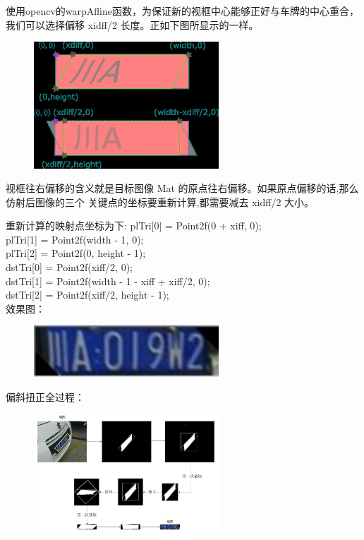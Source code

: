 \begin{enumerate}
使用opencv的warpAffine函数，为保证新的视框中心能够正好与车牌的中心重合，我们可以选择偏移 xidff/2 长度。正如下图所显示的一样。 
\begin{figure}[H]
    \centering 
    \includegraphics[width=0.618\textwidth]{image/2_6_4_6.jpg}    
    \label{logic}
\end{figure}
视框往右偏移的含义就是目标图像 Mat 的原点往右偏移。如果原点偏移的话,那么仿射后图像的三个 关键点的坐标要重新计算,都需要减去 xidff/2 大小。 

重新计算的映射点坐标为下:
plTri[0] = Point2f(0 + xiff, 0); \\
plTri[1] = Point2f(width - 1, 0); \\
plTri[2] = Point2f(0, height - 1); \\
dstTri[0] = Point2f(xiff/2, 0); \\
dstTri[1] = Point2f(width - 1 - xiff + xiff/2, 0); \\
dstTri[2] = Point2f(xiff/2, height - 1); \\

效果图：
\begin{figure}[H]
    \centering 
    \includegraphics[width=0.618\textwidth]{image/2_6_4_7.jpg}    
    \label{logic}
\end{figure}
偏斜扭正全过程：
\begin{figure}[H]
    \centering 
    \includegraphics[width=0.618\textwidth]{image/2_6_4_8.jpg}    
    \label{logic}
\end{figure}
\end{enumerate}
